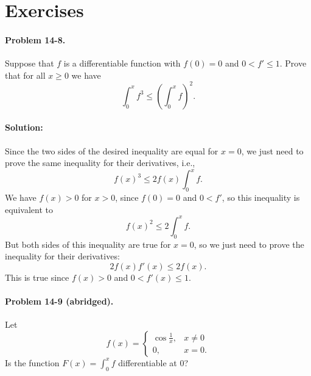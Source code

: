 \documentclass{article}
\begin{document}
\section*{Exercises}

\paragraph{Problem 14-8.} Suppose that $f$ is a differentiable function with
$f(0) = 0$ and $0 < f' \leq 1$. Prove that for all $x \geq 0$ we have
\begin{equation*}
  \int_0^x f^3 \leq \left(\int_0^x f\right)^2.
\end{equation*}

\paragraph{Solution:} Since the two sides of the desired inequality are equal
for $x = 0$, we just need to prove the same inequality for their derivatives,
i.e., \begin{equation*}
  f(x)^3 \leq 2f(x)\int_0^x f.
\end{equation*} We have $f(x) > 0$ for $x > 0$, since $f(0) = 0$ and $0 < f'$,
so this inequality is equivalent to \begin{equation*}
  f(x)^2 \leq 2\int_0^x f.
\end{equation*} But both sides of this inequality are true for $x = 0$, so we
just need to prove the inequality for their derivatives: \begin{equation*}
  2f(x)f'(x) \leq 2f(x).
\end{equation*} This is true since $f(x) > 0$ and $0 < f'(x) \leq 1$.

\paragraph{Problem 14-9 (abridged).} Let \begin{equation*}
  f(x) = \begin{cases}
    \cos\frac{1}{x}, &x \neq 0 \\
    0, &x = 0.
  \end{cases}
\end{equation*} Is the function $F(x) = \int_0^x f$ differentiable at 0?
\end{document}
